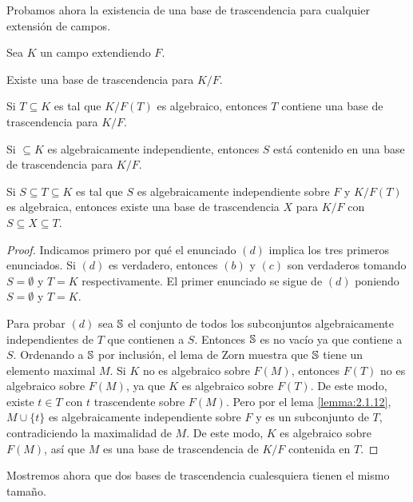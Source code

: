 Probamos ahora la existencia de una base de trascendencia para cualquier extensión de campos.

\begin{theorem}\label{theo:2.1.13}
  Sea $K$ un campo extendiendo $F$.
  \begin{subtheorem}
    \item Existe una base de trascendencia para $K/F$.
    \item Si $T \subseteq K$ es tal que $K/F(T)$ es algebraico, entonces $T$ contiene una base de trascendencia para $K/F$.
    \item Si $\subseteq K$ es algebraicamente independiente, entonces $S$ está contenido en una base de trascendencia para $K/F$.
    \item Si $S \subseteq T \subseteq K$ es tal que $S$ es algebraicamente independiente sobre $F$ y $K/F(T)$ es algebraica, entonces existe una base de trascendencia $X$ para $K/F$ con $S \subseteq X \subseteq T$.
  \end{subtheorem}
\end{theorem}
\begin{proof}
  Indicamos primero por qué el enunciado $(d)$ implica los tres primeros enunciados. Si $(d)$ es verdadero, entonces $(b)$ y $(c)$ son verdaderos tomando $S = \emptyset$ y $T = K$ respectivamente. El primer enunciado se sigue de $(d)$ poniendo $S = \emptyset$ y $T = K$.

  Para probar $(d)$ sea $\mathbb{S}$ el conjunto de todos los subconjuntos algebraicamente independientes de $T$ que contienen a $S$. Entonces $\mathbb{S}$ es no vacío ya que contiene a $S$. Ordenando a $\mathbb{S}$ por inclusión, el lema de Zorn muestra que $\mathbb{S}$ tiene un elemento maximal $M$. Si $K$ no es algebraico sobre $F(M)$, entonces $F(T)$ no es algebraico sobre $F(M)$, ya que $K$ es algebraico sobre $F(T)$. De este modo, existe $t \in T$ con $t$ trascendente sobre $F(M)$. Pero por el lema \ref{lemma:2.1.12}, $M \cup \{t\}$ es algebraicamente independiente sobre $F$ y es un subconjunto de $T$, contradiciendo la maximalidad de $M$. De este modo, $K$ es algebraico sobre $F(M)$, así que $M$ es una base de trascendencia de $K/F$ contenida en $T$.
\end{proof}

Mostremos ahora que dos bases de trascendencia cualesquiera tienen el mismo tamaño.

